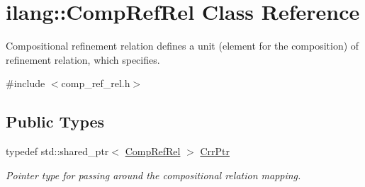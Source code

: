 \hypertarget{classilang_1_1_comp_ref_rel}{}\section{ilang\+:\+:Comp\+Ref\+Rel Class Reference}
\label{classilang_1_1_comp_ref_rel}


Compositional refinement relation defines a unit (element for the composition) of refinement relation, which specifies.  




{\ttfamily \#include $<$comp\+\_\+ref\+\_\+rel.\+h$>$}

\subsection*{Public Types}
\begin{DoxyCompactItemize}
\item 
\mbox{\label{classilang_1_1_comp_ref_rel_a9081b437a14b3a2edef9d30b000ea535}} 
typedef std\+::shared\+\_\+ptr$<$ \mbox{\hyperlink{classilang_1_1_comp_ref_rel}{Comp\+Ref\+Rel}} $>$ \mbox{\hyperlink{classilang_1_1_comp_ref_rel_a9081b437a14b3a2edef9d30b000ea535}{Crr\+Ptr}}
\begin{DoxyCompactList}\small\item\em Pointer type for passing around the compositional relation mapping. \end{DoxyCompactList}\end{DoxyCompactItemize}
